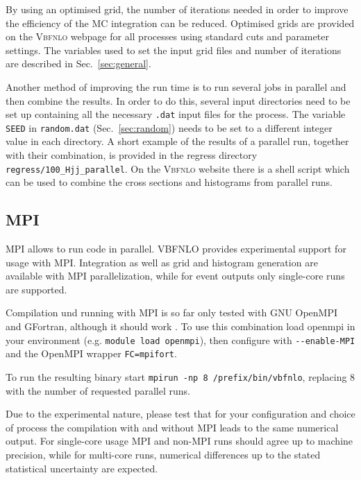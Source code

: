 \documentclass[english,12pt]{article}
\begin{document}
By using an optimised grid, the number of iterations needed in order to improve
the efficiency of the MC integration can be reduced.  Optimised grids are
provided on the \textsc{Vbfnlo} webpage for all processes using standard cuts
and parameter settings.  The variables used to set the input grid files and
number of iterations are described in Sec.~\ref{sec:general}.

Another method of improving the run time is to run several jobs in parallel and
then combine the results.  In order to do this, several input directories need to
be set up containing all the necessary {\tt .dat} input files for the process. 
The variable {\tt SEED} in {\tt random.dat} (Sec.~\ref{sec:random}) needs to be
set to a different integer value in each directory.  A short example of the
results of a parallel run, together with their combination, is provided in the
regress directory {\tt regress/100\_Hjj\_parallel}.  On the \textsc{Vbfnlo}
website there is a shell script which can be used to combine the cross sections
and histograms from parallel runs.



\subsection{MPI}
\label{sec:MPI}

MPI allows to run code in parallel. VBFNLO provides experimental support for usage with MPI.
Integration as well as grid and histogram generation are available with MPI parallelization, while for event
outputs only single-core runs are supported.

Compilation und running with MPI is so far only tested with \textsc{GNU} OpenMPI and
GFortran, although it should work . 
To use this combination load openmpi in your environment (e.g. {\tt module load openmpi}),
then configure with {\tt -{}-enable-MPI} and the OpenMPI wrapper {\tt FC=mpifort}.

To run the resulting binary start {\tt mpirun -np 8 /prefix/bin/vbfnlo}, replacing 8 with
the number of requested parallel runs.

Due to the experimental nature, please test that for your configuration and choice of
process the compilation with and without MPI leads to the same numerical output. For
single-core usage MPI and non-MPI runs should agree up to machine precision, while for
multi-core runs, numerical differences up to the stated statistical uncertainty are expected.
\end{document}
